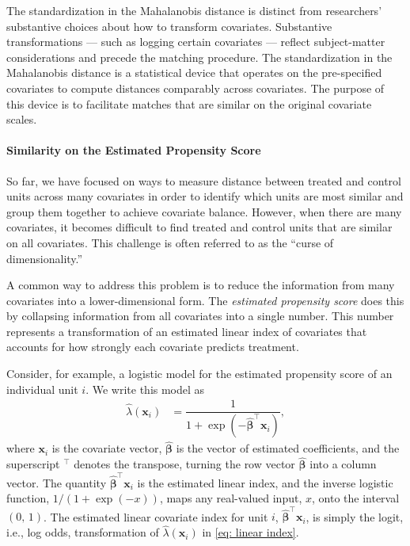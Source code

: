 \documentclass[
  12pt,
  leqno]{article}
\begin{document}
\doublespacing

The standardization in the Mahalanobis distance is distinct from
researchers' substantive choices about how to transform covariates.
Substantive transformations --- such as logging certain covariates ---
reflect subject-matter considerations and precede the matching
procedure. The standardization in the Mahalanobis distance is a
statistical device that operates on the pre-specified covariates to
compute distances comparably across covariates. The purpose of this
device is to facilitate matches that are similar on the original
covariate scales.

\paragraph{Similarity on the Estimated Propensity
Score}\label{similarity-on-the-estimated-propensity-score}

So far, we have focused on ways to measure distance between treated and
control units across many covariates in order to identify which units
are most similar and group them together to achieve covariate balance.
However, when there are many covariates, it becomes difficult to find
treated and control units that are similar on all covariates. This
challenge is often referred to as the ``curse of dimensionality.''

A common way to address this problem is to reduce the information from
many covariates into a lower-dimensional form. The \emph{estimated
propensity score} does this by collapsing information from all
covariates into a single number. This number represents a transformation
of an estimated linear index of covariates that accounts for how
strongly each covariate predicts treatment.

Consider, for example, a logistic model for the estimated propensity
score of an individual unit \(i\). We write this model as
\begin{align} \label{eq: linear index}
\hat{\lambda}(\bm{x}_i) & = \dfrac{1}{1 + \exp(-\bm{\hat{\beta}}^{\top}\bm{x}_i)},
\end{align} where \(\bm{x}_i\) is the covariate vector,
\(\bm{\hat{\beta}}\) is the vector of estimated coefficients, and the
superscript \(^{\top}\) denotes the transpose, turning the row vector
\(\bm{\hat{\beta}}\) into a column vector. The quantity
\(\bm{\hat{\beta}}^{\top}\bm{x}_i\) is the estimated linear index, and
the inverse logistic function, \(1 / (1 + \exp(-x))\), maps any
real-valued input, \(x\), onto the interval \((0, \, 1)\). The estimated
linear covariate index for unit \(i\),
\(\bm{\hat{\beta}}^{\top}\bm{x}_i\), is simply the logit, i.e., log
odds, transformation of \(\hat{\lambda}(\bm{x}_i)\) in
\eqref{eq: linear index}.
\end{document}
